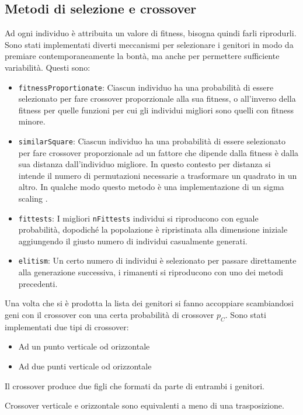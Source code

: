 \documentclass[italian,twoside,twocolumn]{article}
\begin{document}
\subsection{Metodi di selezione e crossover}
Ad ogni individuo è attribuita un valore di fitness, bisogna quindi farli riprodurli. Sono stati implementati diverti meccanismi per selezionare i genitori in modo da premiare contemporaneamente la bontà, ma anche per permettere sufficiente variabilità. Questi sono:
\begin{itemize}
	\item \texttt{fitnessProportionate}: Ciascun individuo ha una probabilità di essere selezionato per fare crossover proporzionale alla sua fitness, o all'inverso della fitness per quelle funzioni per cui gli individui migliori sono quelli con fitness minore.  
	\item \texttt{similarSquare}: Ciascun individuo ha una probabilità di essere selezionato per fare crossover proporzionale ad un fattore che dipende dalla fitness è dalla sua distanza dall'individuo migliore. In questo contesto per distanza si intende il numero di permutazioni necessarie a trasformare un quadrato in un altro. In qualche modo questo metodo è una implementazione di un sigma scaling \cite{Mitchell:1998}.
	\item \texttt{fittests}: I migliori \texttt{nFittests} individui si riproducono con eguale probabilità, dopodiché la popolazione è ripristinata alla dimensione iniziale aggiungendo il giusto numero di individui casualmente generati. 
	\item \texttt{elitism}: Un certo numero di individui è selezionato per passare direttamente alla generazione successiva, i rimanenti si riproducono con uno dei metodi precedenti.
\end{itemize}
Una volta che si è prodotta la lista dei genitori si fanno accoppiare scambiandosi geni con il crossover con una certa probabilità di crossover $ p_C $. Sono stati implementati due tipi di crossover:
\begin{itemize}
	\item Ad un punto verticale od orizzontale
	\item Ad due punti verticale od orizzontale
\end{itemize}
Il crossover produce due figli che formati da parte di entrambi i genitori.

Crossover verticale e orizzontale sono equivalenti a meno di una trasposizione.
\end{document}
